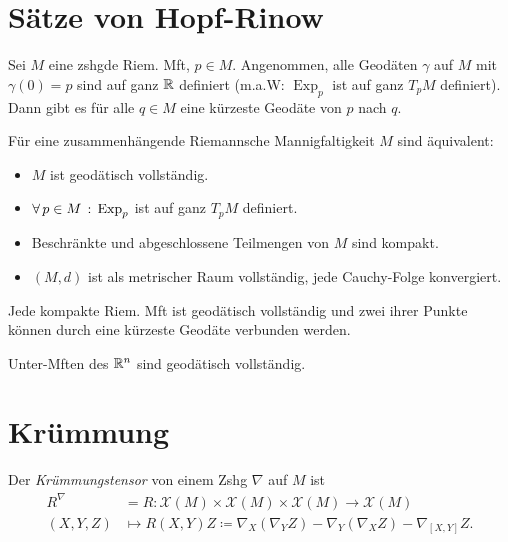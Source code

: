 \documentclass{cheat-sheet}
\DeclareMathOperator{\Exp}{Exp} %
\newcommand{\VF}{\mathcal{X}} %
\begin{document}

\section{Sätze von Hopf-Rinow}

\begin{satz}
  Sei $M$ eine zshgde Riem. Mft, $p \in M$. Angenommen, alle Geodäten $\gamma$ auf $M$ mit $\gamma(0) = p$ sind auf ganz $\mathbb{R}$ definiert (m.a.W: $\Exp_p$ ist auf ganz $T_p M$ definiert). Dann gibt es für alle $q \in M$ eine kürzeste Geodäte von $p$ nach $q$.
\end{satz}

\begin{satz}
  Für eine zusammenhängende Riemannsche Mannigfaltigkeit $M$ sind äquivalent:
  \begin{itemize}
    \item $M$ ist geodätisch vollständig.
    \item $\fa{p \in M} \Exp_p$ ist auf ganz $T_p M$ definiert.
    \item Beschränkte und abgeschlossene Teilmengen von $M$ sind kompakt.
    \item $(M, d)$ ist als metrischer Raum vollständig, \dh{} jede Cauchy-Folge konvergiert.
  \end{itemize}
\end{satz}

\begin{kor}
  Jede kompakte Riem. Mft ist geodätisch vollständig und zwei ihrer Punkte können durch eine kürzeste Geodäte verbunden werden.
\end{kor}

\begin{kor}
  Unter-Mften des $\mathbb{R}^n$ sind geodätisch vollständig.
\end{kor}

\section{Krümmung}

\begin{defn}
  Der \emph{Krümmungstensor} von einem Zshg $\nabla$ auf $M$ ist
  \begin{align*}
    R^{\nabla} & = R : \VF(M) \times \VF(M) \times \VF(M) \to \VF(M) \\
    (X, Y, Z) & \mapsto R(X, Y)Z \coloneqq \nabla_X (\nabla_Y Z) - \nabla_Y (\nabla_X Z) - \nabla_{[X, Y]} Z.
  \end{align*}
\end{defn}
\end{document}
